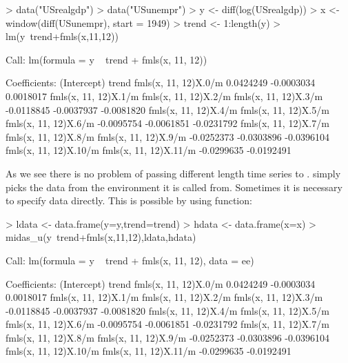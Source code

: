 \documentclass[nojss]{jss}
\begin{document}
\begin{Schunk}
\begin{Sinput}
> data("USrealgdp")
> data("USunempr")
> y <- diff(log(USrealgdp))
> x <- window(diff(USunempr), start = 1949)
> trend <- 1:length(y)
> lm(y~trend+fmls(x,11,12))
\end{Sinput}
\begin{Soutput}
Call:
lm(formula = y ~ trend + fmls(x, 11, 12))

Coefficients:
          (Intercept)                  trend   fmls(x, 11, 12)X.0/m  
            0.0424249             -0.0003034              0.0018017  
 fmls(x, 11, 12)X.1/m   fmls(x, 11, 12)X.2/m   fmls(x, 11, 12)X.3/m  
           -0.0118845             -0.0037937             -0.0081820  
 fmls(x, 11, 12)X.4/m   fmls(x, 11, 12)X.5/m   fmls(x, 11, 12)X.6/m  
           -0.0095754             -0.0061851             -0.0231792  
 fmls(x, 11, 12)X.7/m   fmls(x, 11, 12)X.8/m   fmls(x, 11, 12)X.9/m  
           -0.0252373             -0.0303896             -0.0396104  
fmls(x, 11, 12)X.10/m  fmls(x, 11, 12)X.11/m  
           -0.0299635             -0.0192491  
\end{Soutput}
\end{Schunk}

As we see there is no problem of passing different length time series
to .  simply picks the data from the environment
it is called from. Sometimes it is necessary to specify data
directly. This is possible by using  function:

\begin{Schunk}
\begin{Sinput}
> ldata <- data.frame(y=y,trend=trend) 
> hdata <- data.frame(x=x)
> midas_u(y~trend+fmls(x,11,12),ldata,hdata)
\end{Sinput}
\begin{Soutput}
Call:
lm(formula = y ~ trend + fmls(x, 11, 12), data = ee)

Coefficients:
          (Intercept)                  trend   fmls(x, 11, 12)X.0/m  
            0.0424249             -0.0003034              0.0018017  
 fmls(x, 11, 12)X.1/m   fmls(x, 11, 12)X.2/m   fmls(x, 11, 12)X.3/m  
           -0.0118845             -0.0037937             -0.0081820  
 fmls(x, 11, 12)X.4/m   fmls(x, 11, 12)X.5/m   fmls(x, 11, 12)X.6/m  
           -0.0095754             -0.0061851             -0.0231792  
 fmls(x, 11, 12)X.7/m   fmls(x, 11, 12)X.8/m   fmls(x, 11, 12)X.9/m  
           -0.0252373             -0.0303896             -0.0396104  
fmls(x, 11, 12)X.10/m  fmls(x, 11, 12)X.11/m  
           -0.0299635             -0.0192491  
\end{Soutput}
\end{Schunk}
\end{document}
